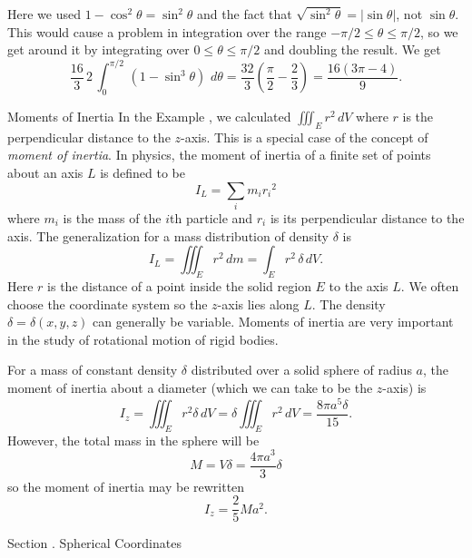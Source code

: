 Here we used
$1 - \cos^2\theta = \sin^2\theta$
and the fact that $\sqrt{\sin^2\theta} = |\sin\theta|$,
not $\sin\theta$.  This would cause a problem in integration
over the range $-\pi/2\le\theta\le\pi/2$, so we get around it by
integrating over $0\le\theta\le\pi/2$ and doubling the result.
We get
$$
\frac {16}3  \, 2\, \int_{0}^{\pi/2}\,(1 - \sin^3\theta)\,\,d\theta 
=\frac {32}3 \left(\frac{\pi}2 - \frac{2}3\right)
= \frac{16(3\pi - 4)}9.
$$

\medskip
\centerline{}
\medskip
\subhead Moments of Inertia \endsubhead
In the Example \SphereEx, we calculated $\iiint_E r^2\,dV$ where
$r$ is the perpendicular distance to the $z$-axis.  This
is a special case of the concept of {\it moment of inertia}.
%
In physics, the moment of inertia of a finite set of points
about an axis $L$ is defined to be
$$
  I_L = \sum_i m_ir_i{}^2
$$
where $m_i$ is the mass of the $i$th particle and $r_i$ is
its perpendicular distance to the axis.  The generalization
for a mass distribution of density $\delta$ is
$$
I_L = \iiint_E r^2\,dm = \int_E r^2 \,\delta\,dV.
$$
Here $r$ is the distance of a point inside the solid region $E$
 to the axis $L$.  We often choose the coordinate
system so the $z$-axis lies along $L$.  The density $\delta
= \delta(x,y,z)$ can generally
be variable.   Moments of inertia are very important in the
study of rotational motion of rigid bodies.
\endexample

\smallskip

  For a mass
of constant density $\delta$ distributed
 over a solid sphere of radius $a$, the moment of inertia
about a diameter (which we can take to be the $z$-axis) is
$$
I_z = \iiint_E r^2\delta\, dV = \delta \iiint_E r^2\, dV = 
\frac{8\pi a^5\delta}{15}.
$$
However, the total mass in the sphere will be 
$$
M = V\delta = \frac {4\pi a^3}3 \delta
$$
so the moment of inertia may be rewritten
$$
  I_z = \frac 25 M a^2.
$$
\endexample

\bigskip

\bigskip
{}
\head Section \sn. Spherical Coordinates \endhead

